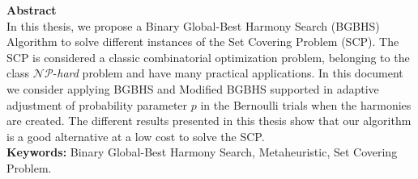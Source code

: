 \noindent
\Large{\textbf{Abstract}}\\

\normalsize
In this thesis, we propose a Binary Global-Best Harmony Search (BGBHS)  Algorithm to solve different instances of the Set Covering Problem (SCP). The SCP is considered a classic combinatorial optimization problem, belonging to the class $\mathcal{N} \mathcal{P}$-\textit{hard} problem and have many practical applications. In this document we consider applying  BGBHS and Modified BGBHS supported in adaptive adjustment of probability parameter $p$ in the Bernoulli trials when the harmonies are created. The different results presented in this thesis show that our algorithm is a good alternative at a low cost to solve the SCP.\\

\textbf{Keywords:} Binary Global-Best Harmony Search, Metaheuristic, Set Covering Problem.